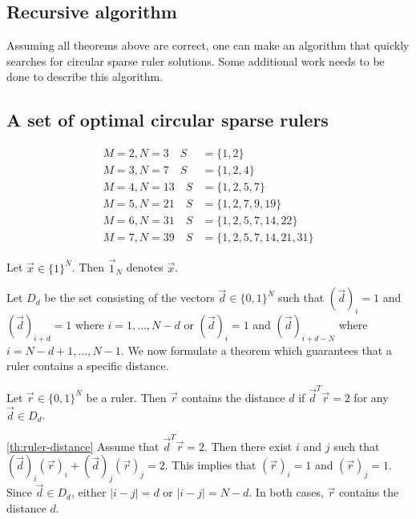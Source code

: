 \documentclass[a4paper, openany, oneside]{memoir}
\begin{document}
\subsection{Recursive algorithm}
Assuming all theorems above are correct, one can make an algorithm that quickly searches for circular sparse ruler solutions. Some additional work needs to be done to describe this algorithm.

\subsection{A set of optimal circular sparse rulers}
\begin{align}
M=2,N=3  \quad S&=\{1,2\}\\
M=3,N=7  \quad S&=\{1,2,4\}\\
M=4,N=13 \quad S&=\{1,2,5,7\}\\
M=5,N=21 \quad S&=\{1,2,7,9, 19\}\\
M=6,N=31 \quad S&=\{1,2,5,7,14,22\}\\
M=7,N=39 \quad S&=\{1,2,5,7,14,21,31\}
\end{align}


\begin{blockDefinition}
    Let $\vec{x} \in \{1\}^N$. Then $\vec{1}_N$ denotes $\vec{x}$.
\end{blockDefinition}

Let $D_d$ be the set consisting of the vectors $\vec{d} \in \{0,1\}^N$ such that $(\vec{d})_i=1$ and $(\vec{d})_{i+d}=1$ where $i = 1,\ldots,N-d$ or $(\vec{d})_i=1$ and $(\vec{d})_{i+d-N}$ where $i = N-d+1,\ldots,N-1$.
We now formulate a theorem which guarantees that a ruler contains a specific distance.

\begin{blockTheorem} \label{th:ruler-distance}\nolinebreak
    Let $\vec{r} \in \{0,1\}^N$ be a ruler. Then $\vec{r}$ contains the distance $d$ if $\vec{d}^T \vec{r} = 2$ for any $\vec{d} \in D_d$.\nolinebreak
\end{blockTheorem}

\begin{blockProofTheorem}{\ref{th:ruler-distance}}
    Assume that $\vec{d}^T\vec{r} = 2$. Then there exist $i$ and $j$ such that $(\vec{d})_i (\vec{r})_i + (\vec{d})_j (\vec{r})_j = 2$. This implies that $(\vec{r})_i = 1$ and $(\vec{r})_j = 1$. Since $\vec{d} \in D_d$, either $|i-j|=d$ or $|i-j| = N-d$. In both cases, $\vec{r}$ contains the distance $d$. 
\end{blockProofTheorem}
\end{document}
